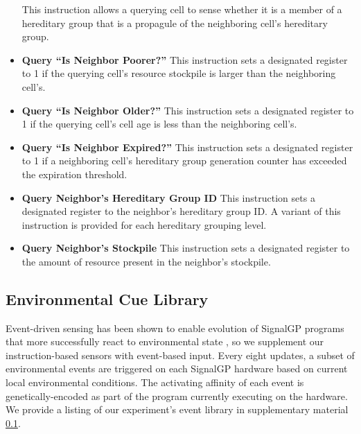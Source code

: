 \begin{itemize}
This instruction allows a querying cell to sense whether it is a member of a hereditary group that is a propagule of the neighboring cell's hereditary group.
\item \textbf{Query ``Is Neighbor Poorer?''}
This instruction sets a designated register to 1 if the querying cell's resource stockpile is larger than the neighboring cell's.
\item \textbf{Query ``Is Neighbor Older?''}
This instruction sets a designated register to 1 if the querying cell's cell age is less than the neighboring cell's.
\item \textbf{Query ``Is Neighbor Expired?''}
This instruction sets a designated register to 1 if a neighboring cell's hereditary group generation counter has exceeded the expiration threshold.
\item \textbf{Query Neighbor's Hereditary Group ID}
This instruction sets a designated register to the neighbor's hereditary group ID.
A variant of this instruction is provided for each hereditary grouping level.
\item \textbf{Query Neighbor's Stockpile}
This instruction sets a designated register to the amount of resource present in the neighbor's stockpile.
\end{itemize}

\subsection{Environmental Cue Library} \label{sup:environmental_cue_library}

Event-driven sensing has been shown to enable evolution of SignalGP programs that more successfully react to  environmental state \cite{lalejini2018evolving}, so we supplement our instruction-based sensors with event-based input.
Every eight updates, a subset of environmental events are triggered on each SignalGP hardware based on current local environmental conditions.
The activating affinity of each event is genetically-encoded as part of the program currently executing on the hardware.
We provide a listing of our experiment's event library in supplementary material \ref{sup:environmental_cue_library}.

